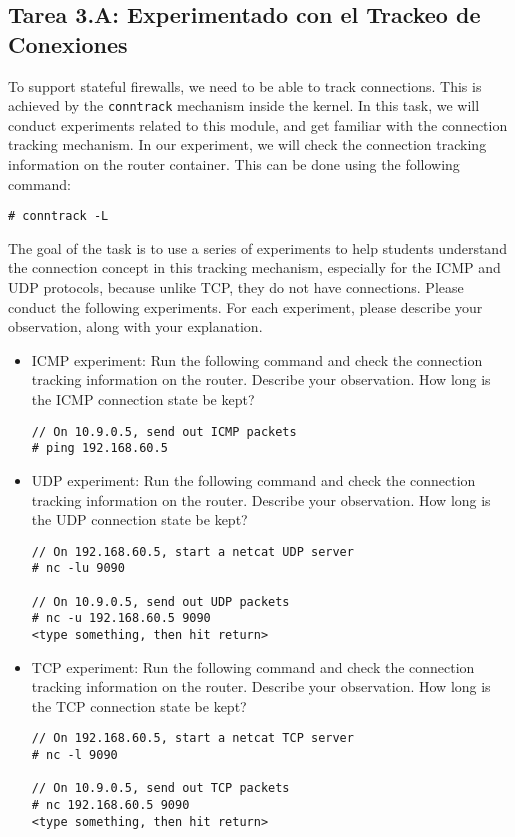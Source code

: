 \subsection{Tarea 3.A: Experimentado con el Trackeo de Conexiones} 


To support stateful firewalls, we need to be able to track connections. 
This is achieved by the \texttt{conntrack} mechanism inside the kernel. 
In this task, we will conduct experiments related to this module, and 
get familiar with the connection tracking mechanism. 
In our experiment, we will check the connection tracking information
on the router container. This can be done using the following command: 

\begin{lstlisting}
# conntrack -L
\end{lstlisting}

The goal of the task is to use a series of experiments to 
help students understand the 
connection concept in this tracking mechanism, especially
for the ICMP and UDP protocols, because unlike TCP,  they 
do not have connections. 
Please conduct the following experiments. For each experiment, please 
describe your observation, along with your explanation. 

\begin{itemize}
\item ICMP experiment: Run the following command and 
check the connection tracking information on the router. Describe
your observation. How long is the ICMP connection state be kept? 

\begin{lstlisting}
// On 10.9.0.5, send out ICMP packets
# ping 192.168.60.5
\end{lstlisting}

\item UDP experiment: Run the following command and 
check the connection tracking information on the router. Describe
your observation. How long is the UDP connection state be kept? 


\begin{lstlisting}
// On 192.168.60.5, start a netcat UDP server
# nc -lu 9090

// On 10.9.0.5, send out UDP packets  
# nc -u 192.168.60.5 9090
<type something, then hit return>
\end{lstlisting}


\item TCP experiment: Run the following command and 
check the connection tracking information on the router. Describe
your observation. How long is the TCP connection state be kept? 

\begin{lstlisting}
// On 192.168.60.5, start a netcat TCP server
# nc -l 9090

// On 10.9.0.5, send out TCP packets 
# nc 192.168.60.5 9090
<type something, then hit return>
\end{lstlisting}

\end{itemize}
 


